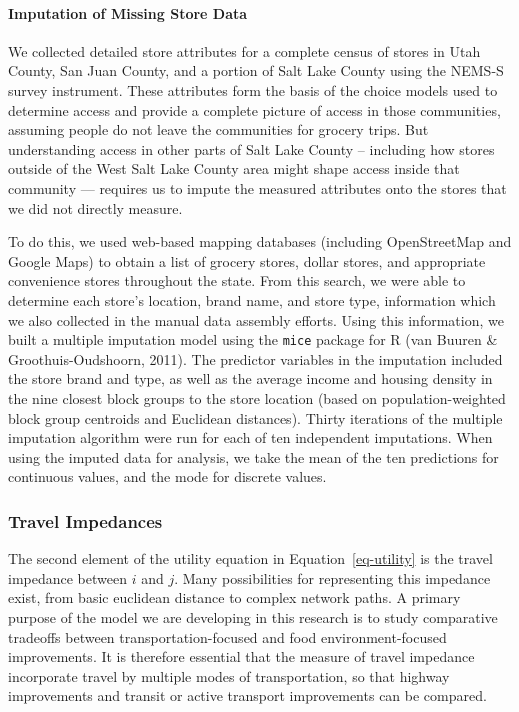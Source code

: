 \documentclass[
  letterpaper,
  number,
  review,
  3p]{elsarticle}
\let\oldparagraph\paragraph
\renewcommand{\paragraph}[1]{\oldparagraph{#1}\mbox{}}
\begin{document}
\paragraph{Imputation of Missing Store
Data}\label{imputation-of-missing-store-data}

We collected detailed store attributes for a complete census of stores
in Utah County, San Juan County, and a portion of Salt Lake County using
the NEMS-S survey instrument. These attributes form the basis of the
choice models used to determine access and provide a complete picture of
access in those communities, assuming people do not leave the
communities for grocery trips. But understanding access in other parts
of Salt Lake County -- including how stores outside of the West Salt
Lake County area might shape access inside that community --- requires
us to impute the measured attributes onto the stores that we did not
directly measure.

To do this, we used web-based mapping databases (including OpenStreetMap
and Google Maps) to obtain a list of grocery stores, dollar stores, and
appropriate convenience stores throughout the state. From this search,
we were able to determine each store's location, brand name, and store
type, information which we also collected in the manual data assembly
efforts. Using this information, we built a multiple imputation model
using the \texttt{mice} package for R (van Buuren \&
Groothuis-Oudshoorn, 2011). The predictor variables in the imputation
included the store brand and type, as well as the average income and
housing density in the nine closest block groups to the store location
(based on population-weighted block group centroids and Euclidean
distances). Thirty iterations of the multiple imputation algorithm were
run for each of ten independent imputations. When using the imputed data
for analysis, we take the mean of the ten predictions for continuous
values, and the mode for discrete values.

\subsubsection{Travel Impedances}\label{sec-mcls}

The second element of the utility equation in Equation~\ref{eq-utility}
is the travel impedance between \(i\) and \(j\). Many possibilities for
representing this impedance exist, from basic euclidean distance to
complex network paths. A primary purpose of the model we are developing
in this research is to study comparative tradeoffs between
transportation-focused and food environment-focused improvements. It is
therefore essential that the measure of travel impedance incorporate
travel by multiple modes of transportation, so that highway improvements
and transit or active transport improvements can be compared.
\end{document}
